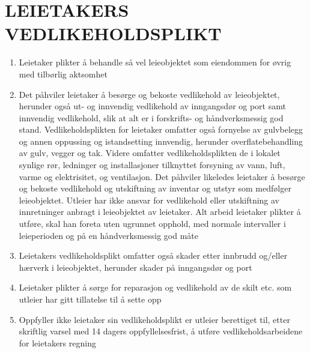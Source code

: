 \section{LEIETAKERS VEDLIKEHOLDSPLIKT}


    \begin{enumerate}

        \item Leietaker plikter å behandle så vel leieobjektet som eiendommen for øvrig med tilbørlig aktsomhet

        \item Det påhviler leietaker å besørge og bekoste vedlikehold av leieobjektet, herunder også ut- og innvendig
        vedlikehold av inngangsdør og port samt innvendig vedlikehold, slik at
        alt er i forskrifts- og håndverksmessig god stand. Vedlikeholdsplikten for leietaker omfatter også
        fornyelse av gulvbelegg og annen oppussing og istandsetting innvendig, herunder
        overflatebehandling av gulv, vegger og tak. Videre omfatter vedlikeholdsplikten de i lokalet synlige rør,
        ledninger og installasjoner tilknyttet forsyning av vann, luft, varme og elektrisitet, og
        ventilasjon. Det påhviler likeledes leietaker å besørge og bekoste vedlikehold og utskiftning
        av inventar og utstyr som medfølger leieobjektet. Utleier har ikke ansvar for vedlikehold eller utskiftning
        av innretninger anbragt i leieobjektet av leietaker. Alt arbeid leietaker plikter å utføre, skal han foreta uten
        ugrunnet opphold, med normale intervaller i leieperioden og på en håndverksmessig god måte

        \item Leietakers vedlikeholdsplikt omfatter også skader etter innbrudd og/eller hærverk i leieobjektet,
        herunder skader på inngangsdør og port

        \item Leietaker plikter å sørge for reparasjon og vedlikehold av de skilt etc. som utleier har gitt tillatelse til å
        sette opp

        \item Oppfyller ikke leietaker sin vedlikeholdsplikt er utleier berettiget til, etter skriftlig varsel med 14
        dagers oppfyllelsesfrist, å utføre vedlikeholdsarbeidene for leietakers regning



    \end{enumerate}
